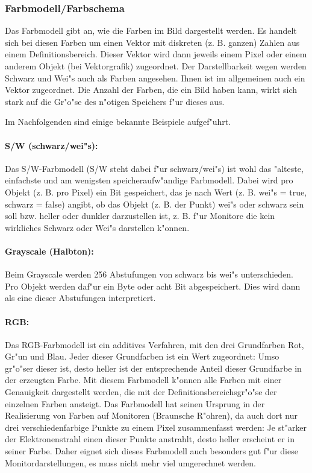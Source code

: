 \subsubsection{Farbmodell/Farbschema}

Das Farbmodell gibt an, wie die Farben im Bild dargestellt werden. Es handelt sich bei diesen Farben um einen Vektor mit diskreten (z. B. ganzen) Zahlen aus einem Definitionsbereich. Dieser Vektor wird dann jeweils einem Pixel oder einem anderem Objekt (bei Vektorgrafik) zugeordnet. Der Darstellbarkeit wegen werden Schwarz und Wei"s auch als Farben angesehen. Ihnen ist im allgemeinen auch ein Vektor zugeordnet.
Die Anzahl der Farben, die ein Bild haben kann, wirkt sich stark auf die Gr"o"se des n"otigen Speichers f"ur dieses aus.

\bigskip\noindent
Im Nachfolgenden sind einige bekannte Beispiele aufgef"uhrt.

\paragraph{S/W (schwarz/wei"s):}

Das S/W-Farbmodell (S/W steht dabei f"ur schwarz/wei"s) ist wohl das "alteste, einfachste und am wenigsten speicheraufw"andige Farbmodell. Dabei wird pro Objekt (z. B. pro Pixel) ein Bit gespeichert, das je nach Wert (z. B. wei"s = true, schwarz = false) angibt, ob das Objekt (z. B. der Punkt) wei"s oder schwarz sein soll bzw. heller oder dunkler darzustellen ist, z. B. f"ur Monitore die kein wirkliches Schwarz oder Wei"s darstellen k"onnen.


\paragraph{Grayscale (Halbton):}

Beim Grayscale werden 256 Abstufungen von schwarz bis wei"s unterschieden. Pro Objekt werden daf"ur ein Byte oder acht Bit abgespeichert. Dies wird dann als eine dieser Abstufungen interpretiert.


\paragraph{RGB:}

Das RGB-Farbmodell ist ein additives Verfahren, mit den drei Grundfarben Rot, Gr"un und Blau. Jeder dieser Grundfarben ist ein Wert zugeordnet: Umso gr"o"ser dieser ist, desto heller ist der entsprechende Anteil dieser Grundfarbe in der erzeugten Farbe. %
Mit diesem Farbmodell k"onnen alle Farben mit einer Genauigkeit dargestellt werden, die mit der Definitionsbereichsgr"o"se der einzelnen Farben ansteigt.
Das Farbmodell hat seinen Ursprung in der Realisierung von Farben auf Monitoren (Braunsche R"ohren), da auch dort nur drei verschiedenfarbige Punkte zu einem Pixel zusammenfasst werden: Je st"arker der Elektronenstrahl einen dieser Punkte anstrahlt, desto heller erscheint er in seiner Farbe. Daher eignet sich dieses Farbmodell auch besonders gut f"ur diese Monitordarstellungen, es muss nicht mehr viel umgerechnet werden.

